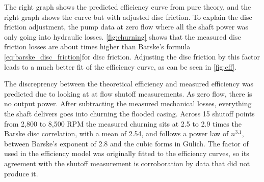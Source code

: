 
The right graph shows the predicted efficiency curve from pure theory, and the right graph shows the curve but with adjusted disc friction. To explain the disc friction adjustment, the pump data at zero flow where all the shaft power was only going into hydraulic losses. \cref{fig:churning} shows that the measured disc friction losses are about \valPumpChurnMult times higher than Barske's formula \cref{eq:barske_disc_friction}for disc friction. Adjusting the disc friction by this factor leads to a much better fit of the efficiency curve, as can be seen in \cref{fig:eff}.


The discreprency between the theoretical efficiency and measured efficiency was predicted due to looking at at flow shutoff measurements. As zero flow, there is no output power. After subtracting the measured mechanical losses, everything the shaft delivers goes into churning the flooded casing. Across 15 shutoff points from 2,800 to 8,500 RPM the measured churning sits at 2.5 to 2.9 times the Barske disc correlation, with a mean of 2.54, and follows a power law of $n^{3.1}$, between Barske's exponent of 2.8 and the cubic forms in Gülich. The factor of \valPumpChurnMult{} used in the efficiency model was originally fitted to the efficiency curves, so its agreement with the shutoff measurement is corroboration by data that did not produce it. %


